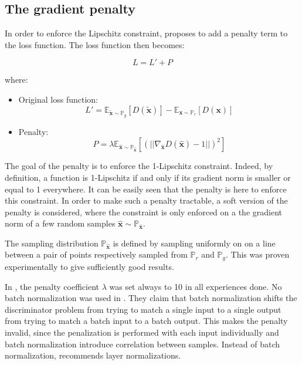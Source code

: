 \documentclass[11pt,a4paper,twoside]{report}
\begin{document}
\subsection{The gradient penalty}

In order to enforce the Lipschitz constraint, \cite{DBLP:journals/corr/GulrajaniAADC17} proposes to add a penalty term to the loss function. The loss function then becomes: 

\begin{equation}
    L = L' + P
\end{equation}

where:

\begin{itemize}
    \item Original loss function: 
    \begin{equation}
        L' = \mathbb{E}_{\mathbf{\tilde{x}} \sim \mathbb{P}_g} [D(\mathbf{\tilde{x}})] - \mathbb{E}_{\mathbf{x} \sim \mathbb{P}_r} [D(\mathbf{x})]
    \end{equation}
    \item Penalty:
    \begin{equation}
        P = \lambda \mathbb{E}_{\hat{\mathbf{x}} \sim \mathbb{P}_{\hat{\mathbf{x}}}}[(||\nabla_{\hat{\mathbf{x}}} D(\hat{\mathbf{x}})-1||)^2]
    \end{equation}
\end{itemize}

The goal of the penalty is to enforce the 1-Lipschitz constraint. Indeed, by definition, a function is 1-Lipschitz if and only if its gradient norm is smaller or equal to 1 everywhere. It can be easily seen that the penalty is here to enforce this constraint. In order to make such a penalty tractable, a soft version of the penalty is considered, where the constraint is only enforced on a the gradient norm of a few random samples $\hat{\mathbf{x}} \sim \mathbb{P}_{\hat{\mathbf{x}}}$.

The sampling distribution $\mathbb{P}_{\hat{\mathbf{x}}}$ is defined by sampling uniformly on on a line between a pair of points respectively sampled from $\mathbb{P}_{r}$ and $\mathbb{P}_{g}$. This was proven experimentally to give sufficiently good results.

In \cite{DBLP:journals/corr/GulrajaniAADC17}, the penalty coefficient $\lambda$ was set always to 10 in all experiences done. No batch normalization was used in \cite{DBLP:journals/corr/GulrajaniAADC17}. They claim that batch normalization shifts the discriminator problem from trying to match a single input to a single output from trying to match a batch input to a batch output. This makes the penalty invalid, since the penalization is performed with each input individually and batch normalization introduce correlation between samples. Instead of batch normalization, \cite{DBLP:journals/corr/GulrajaniAADC17} recommends layer normalizations.
\end{document}
